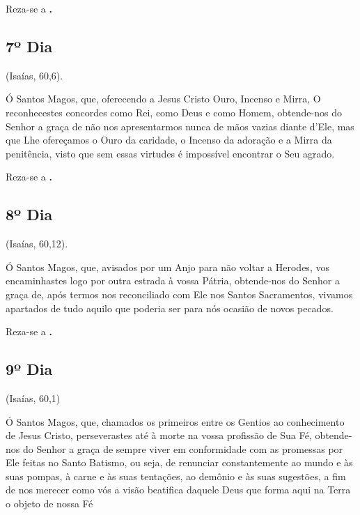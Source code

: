 \documentclass[a4paper,14pt]{extarticle} \usepackage[utf8]{inputenc}
\begin{document}
Reza-se a \textbf{.}



\subsection{7º Dia}

 (Isaías, 60,6).

Ó Santos Magos, que, oferecendo a Jesus Cristo Ouro, Incenso e Mirra, O reconhecestes concordes como Rei, como Deus e como Homem, obtende-nos do Senhor a graça de não nos apresentarmos nunca de mãos vazias diante d’Ele, mas que Lhe ofereçamos o Ouro da caridade, o Incenso da adoração e a Mirra da penitência, visto que sem essas virtudes é impossível encontrar o Seu agrado. 


Reza-se a \textbf{.}


\subsection{8º Dia}

 (Isaías, 60,12).

Ó Santos Magos, que, avisados por um Anjo para não voltar a Herodes, vos encaminhastes logo por outra estrada à vossa Pátria, obtende-nos do Senhor a graça de, após termos nos reconciliado com Ele nos Santos Sacramentos, vivamos apartados de tudo aquilo que poderia ser para nós ocasião de novos pecados.


Reza-se a \textbf{.}


\subsection{9º Dia}

 (Isaías, 60,1)

Ó Santos Magos, que, chamados os primeiros entre os Gentios ao conhecimento de Jesus Cristo, perseverastes até à morte na vossa profissão de Sua Fé, obtende-nos do Senhor a graça de sempre viver em conformidade com as promessas por Ele feitas no Santo Batismo, ou seja, de renunciar constantemente ao mundo e às suas pompas, à carne e às suas tentações, ao demônio e às suas sugestões, a fim de nos merecer como vós a visão beatifica daquele Deus que forma aqui na Terra o objeto de nossa Fé 
\end{document}
